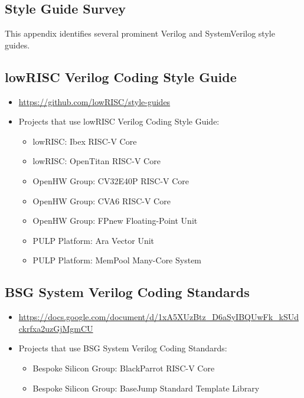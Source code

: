 \begin{appendices}
\chapter{Style Guide Survey}
\label{appx:style_guides}

This appendix identifies several prominent Verilog and SystemVerilog style guides.

\section{lowRISC Verilog Coding Style Guide}

\begin{itemize}
    \item \url{https://github.com/lowRISC/style-guides} \cite{lowRISCstyleguides}
    \item Projects that use lowRISC Verilog Coding Style Guide:
    \begin{itemize}
        \item lowRISC: Ibex RISC-V Core \cite{Ibex}
        \item lowRISC: OpenTitan RISC-V Core \cite{OpenTitan}
        \item OpenHW Group: CV32E40P RISC-V Core \cite{cv32e40p}
        \item OpenHW Group: CVA6 RISC-V Core \cite{cva6}
        \item OpenHW Group: FPnew Floating-Point Unit \cite{cvfpu}
        \item PULP Platform: Ara Vector Unit \cite{Ara}
        \item PULP Platform: MemPool Many-Core System \cite{MemPool}
    \end{itemize}
\end{itemize}

\pagebreak

\section{BSG System Verilog Coding Standards}

\begin{itemize}
    \item {\fontsize{9}{12} \url{https://docs.google.com/document/d/1xA5XUzBtz_D6aSyIBQUwFk_kSUdckrfxa2uzGjMgmCU}} \cite{BSGstyleguide}
    \item Projects that use BSG System Verilog Coding Standards:
    \begin{itemize}
        \item Bespoke Silicon Group: BlackParrot RISC-V Core \cite{blackparrot}
        \item Bespoke Silicon Group: BaseJump Standard Template Library \cite{basejumpstl}
    \end{itemize}
\end{itemize}


\end{appendices}
